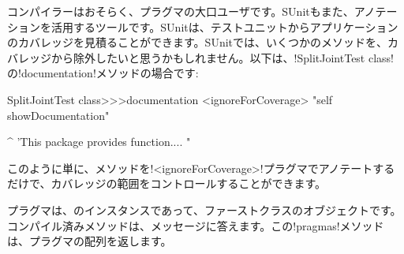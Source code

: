 \documentclass[a4paper,10pt,twoside]{book}
\begin{document}
コンパイラーはおそらく、プラグマの大口ユーザです。SUnitもまた、アノテーションを活用するツールです。SUnitは、テストユニットからアプリケーションのカバレッジを見積ることができます。SUnitでは、いくつかのメソッドを、カバレッジから除外したいと思うかもしれません。以下は、\ct!SplitJointTest class!の\ct!documentation!メソッドの場合です:

\begin{code}{}
SplitJointTest class>>>documentation
	<ignoreForCoverage>
	"self showDocumentation"
	
	^ 'This package provides function.... "
\end{code}

このように単に、メソッドを\ct!<ignoreForCoverage>!プラグマでアノテートするだけで、カバレッジの範囲をコントロールすることができます。


%	


プラグマは、のインスタンスであって、ファーストクラスのオブジェクトです。コンパイル済みメソッドは、メッセージに答えます。この\ct!pragmas!メソッドは、プラグマの配列を返します。
\end{document}
